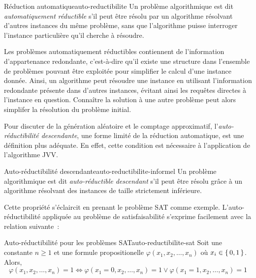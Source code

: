 
\begin{subdefinition}{Réduction automatique}{auto-reductibilite}
    Un problème algorithmique est dit \textit{automatiquement réductible} s'il peut être résolu par un algorithme résolvant d'autres instances du même problème, sans que l'algorithme puisse interroger l'instance particulière qu'il cherche à résoudre.
\end{subdefinition}

Les problèmes automatiquement réductibles contiennent de l'information d'appartenance redondante, c'est-à-dire qu'il existe une structure dans l'ensemble de problèmes pouvant être exploitée pour simplifier le calcul d'une instance donnée. Ainsi, un algorithme peut résoudre une instance en utilisant l'information redondante présente dans d'autres instances, évitant ainsi les requêtes directes à l'instance en question. Connaître la solution à une autre problème peut alors simplifer la résolution du problème initial. 


Pour discuter de la génération aléatoire et le comptage approximatif, l'\textit{auto-réductibilité descendante}, une forme limité de la réduction automatique, est une définition plus adéquate. En effet, cette condition est nécessaire à l'application de l'algorithme JVV.

\begin{maindefinition}{Auto-réductibilité descendante}{auto-reductibilite-informel}
    Un problème algorithmique est dit \textit{auto-réductible descendant} s'il peut être résolu grâce à un algorithme résolvant des instances de taille strictement inférieure.
\end{maindefinition}


Cette propriété s'éclaircit en prenant le problème SAT comme exemple. L'auto-réductibilité appliquée au problème de satisfaisabilité s'exprime facilement avec la relation suivante~\cite{hemaspaandraPowerSelfReducibilitySelectivity2020}:

\begin{relation}{Auto-réductibilité pour les problèmes SAT}{auto-reductibilite-sat}
    Soit une constante $n \geq 1$ et une formule propositionelle $\varphi(x_{1}, x_{2}, \dots, x_{n})$ où $x_{i} \in \set{ 0, 1 }$. Alors,
    \begin{equation*}
        \varphi(x_{1}, x_{2}, \dots, x_{n}) = 1 \iff \varphi(x_{1}=0, x_{2}, \dots, x_{n}) = 1 \lor \varphi(x_{1}=1, x_{2}, \dots, x_{n}) = 1
    \end{equation*}
\end{relation}

